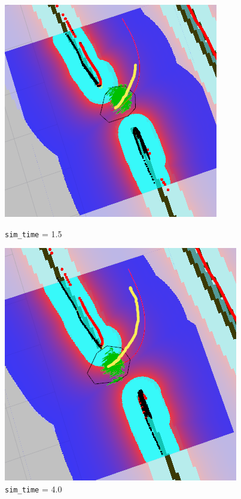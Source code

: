 \documentclass[12pt]{article}
\begin{document}
\begin{figure}[!htb]
  \includegraphics[width=\linewidth]{simtime15.png}
  \caption{\texttt{sim\_time} = 1.5}
\endminipage\hfill
{}
  \includegraphics[width=\linewidth]{simtime4.png}
  \caption{\texttt{sim\_time} = 4.0}
\endminipage\hfill
\end{figure}
\end{document}
